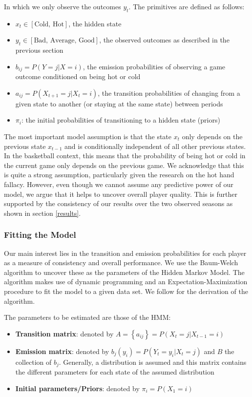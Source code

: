 \documentclass[12pt, authoryear]{elsarticle}
\begin{document}
In which we only observe the outcomes $y_t$. The primitives are defined as follows:

\begin{itemize}
	\item $x_t \in [\text{Cold, Hot}]$, the hidden state
	\item $y_t \in [\text{Bad, Average, Good}]$, the observed outcomes as described in the previous section
	\item $b_{ij} = P(Y = j | X = i)$, the emission probabilities of observing a game outcome conditioned on being hot or cold
	\item $a_{ij} = P(X_{t+1} = j | X_t =i)$, the transition probabilities of changing from a given state to another (or staying at the same state) between periods
	\item $\pi_i$: the initial probabilities of transitioning to a hidden state (priors)
\end{itemize}

The most important model assumption is that the state $x_t$ only depends on the previous state $x_{t-1}$ and is conditionally independent of all other previous states. In the basketball context, this means that the probability of being hot or cold in the current game only depends on the previous game. We acknowledge that this is quite a strong assumption, particularly given the research on the hot hand fallacy. However, even though we cannot assume any predictive power of our model, we argue that it helps to uncover overall player quality. This is further supported by the consistency of our results over the two observed seasons as shown in section \ref{results}.

\subsubsection{Fitting the Model}

Our main interest lies in the transition and emission probabilities for each player as a measure of consistency and overall performance. We use the Baum-Welch algorithm to uncover these as the parameters of the Hidden Markov Model. The algorithm makes use of dynamic programming and an Expectation-Maximization procedure to fit the model to a given data set. We follow \cite{rabiner1989tutorial} for the derivation of the algorithm.

The parameters to be estimated are those of the HMM: 
\begin{itemize}
	\item \textbf{Transition matrix}: denoted by $A=\left\{a_{i j}\right\}=P\left(X_{t}=j | X_{t-1}=i\right)$
	\item \textbf{Emission matrix}: denoted by $b_{j}\left(y_{i}\right)=P\left(Y_{t}=y_{i} | X_{t}=j\right)$ and $B$ the collection of $b_{j}$. Generally, a distribution is assumed and this matrix contains the different parameters for each state of the assumed distribution
	\item \textbf{Initial parameters/Priors}: denoted by $\pi_{i}=P\left(X_{1}=i\right)$
\end{itemize}
\end{document}
